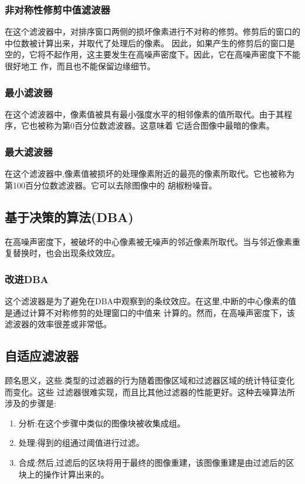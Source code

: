 \documentclass[12pt]{article} %
\begin{document}
\subsubsection{非对称性修剪中值滤波器}
在这个滤波器中，对排序窗口两侧的损坏像素进行不对称的修剪。修剪后的窗口的中位数被计算出来，并取代了处理后的像素。
因此，如果产生的修剪后的窗口是空的，它将不起作用，这主要发生在高噪声密度下。因此，它在高噪声密度下不能很好地工
作，而且也不能保留边缘细节\cite{ref11}。

\subsubsection{最小滤波器}
在这个滤波器中，像素值被具有最小强度水平的相邻像素的值所取代。由于其程序，它也被称为第0百分位数滤波器。这意味着
它适合图像中最暗的像素。

\subsubsection{最大滤波器}
在这个滤波器中,像素值被损坏的处理像素附近的最亮的像素所取代。它也被称为第100百分位数滤波器。它可以去除图像中的
胡椒粉噪音。

\subsection{基于决策的算法(DBA)}
在高噪声密度下，被破坏的中心像素被无噪声的邻近像素所取代。当与邻近像素重复替换时，也会出现条纹效应\cite{ref3,ref4,ref11,ref26}。

\subsubsection{改进DBA}
这个滤波器是为了避免在DBA中观察到的条纹效应。在这里,中断的中心像素的值是通过计算不对称修剪的处理窗口的中值来
计算的。然而，在高噪声密度下，该滤波器的效率很差或非常低。

\subsection{自适应滤波器}
顾名思义，这些\cite{ref1,ref2,ref12,ref16,ref19,ref21,ref32}.类型的过滤器的行为随着图像区域和过滤器区域的统计特征变化而变化。这些
过滤器很难实现，而且比其他过滤器的性能更好。这种去噪算法所涉及的步骤是:
\begin{enumerate}
    \item 分析:在这个步骤中类似的图像块被收集成组。
    \item 处理:得到的组通过阈值进行过滤。
    \item 合成:然后,过滤后的区块将用于最终的图像重建，该图像重建是由过滤后的区块上的操作计算出来的。
\end{enumerate}
\end{document}
